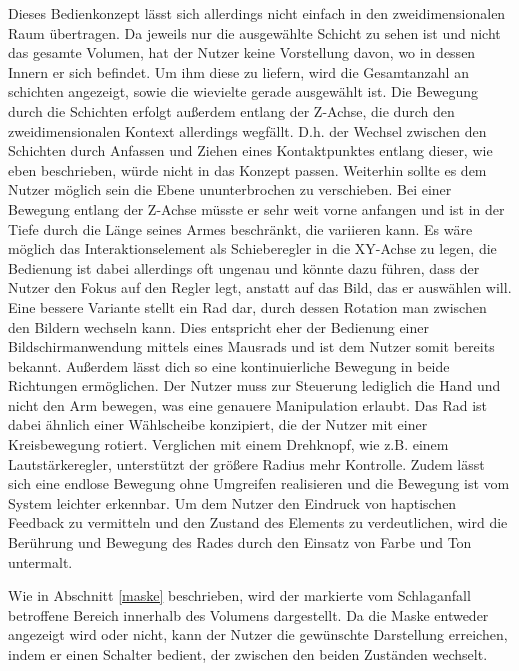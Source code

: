 Dieses Bedienkonzept lässt sich allerdings nicht einfach in den zweidimensionalen Raum übertragen. Da jeweils nur die ausgewählte Schicht zu sehen ist und nicht das gesamte Volumen, hat der Nutzer keine Vorstellung davon, wo in dessen Innern er sich befindet. Um ihm diese zu liefern, wird die Gesamtanzahl an schichten angezeigt, sowie die wievielte gerade ausgewählt ist. 
Die Bewegung durch die Schichten erfolgt außerdem entlang der Z-Achse, die durch den zweidimensionalen Kontext allerdings wegfällt. D.h. der Wechsel zwischen den Schichten durch Anfassen und Ziehen eines Kontaktpunktes entlang dieser, wie eben beschrieben, würde nicht in das Konzept passen. 
Weiterhin sollte es dem Nutzer möglich sein die Ebene ununterbrochen zu verschieben. Bei einer Bewegung entlang der Z-Achse müsste er sehr weit vorne anfangen und ist in der Tiefe durch die Länge seines Armes beschränkt, die  variieren kann. Es wäre möglich das Interaktionselement als Schieberegler in die XY-Achse zu legen, die Bedienung ist dabei allerdings oft ungenau und könnte dazu führen, dass der Nutzer den Fokus auf den Regler legt, anstatt auf das Bild, das er auswählen will. Eine bessere Variante stellt ein Rad dar, durch dessen Rotation man zwischen den Bildern wechseln kann. Dies entspricht eher der Bedienung einer Bildschirmanwendung mittels eines Mausrads und ist dem Nutzer somit bereits bekannt. Außerdem lässt dich so eine kontinuierliche Bewegung in beide Richtungen ermöglichen. Der Nutzer muss zur Steuerung lediglich die Hand und nicht den Arm bewegen, was eine genauere Manipulation erlaubt. 
Das Rad ist dabei ähnlich einer Wählscheibe konzipiert, die der Nutzer mit einer Kreisbewegung rotiert. Verglichen mit einem Drehknopf, wie z.B. einem Lautstärkeregler, unterstützt der größere Radius mehr Kontrolle. Zudem lässt sich eine endlose Bewegung ohne Umgreifen realisieren und die Bewegung ist vom System leichter erkennbar. 
Um dem Nutzer den Eindruck von haptischen Feedback zu vermitteln und den Zustand des Elements zu verdeutlichen, wird die Berührung und Bewegung des Rades durch den Einsatz von Farbe und Ton untermalt.


Wie in Abschnitt \ref{maske} beschrieben, wird der markierte vom Schlaganfall betroffene Bereich innerhalb des Volumens dargestellt. Da die Maske entweder angezeigt wird oder nicht, kann der Nutzer die gewünschte Darstellung erreichen, indem er einen Schalter bedient, der zwischen den beiden Zuständen wechselt.

